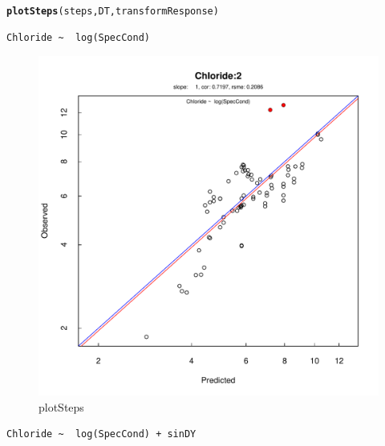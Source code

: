 \documentclass[a4paper,11pt]{article}\usepackage[]{graphicx}\usepackage[]{color}
\makeatletter
\def\maxwidth{ %
  \ifdim\Gin@nat@width>\linewidth
    \linewidth
  \else
    \Gin@nat@width
  \fi
}
\newcommand{\hlstd}[1]{\textcolor[rgb]{0.345,0.345,0.345}{#1}}%
\newcommand{\hlkwd}[1]{\textcolor[rgb]{0.737,0.353,0.396}{\textbf{#1}}}%
\newenvironment{kframe}{%
 \def\at@end@of@kframe{}%
 \ifinner\ifhmode%
  \def\at@end@of@kframe{\end{minipage}}%
  \begin{minipage}{\columnwidth}%
 \fi\fi%
 \def\FrameCommand##1{\hskip\@totalleftmargin \hskip-\fboxsep
 \colorbox{shadecolor}{##1}\hskip-\fboxsep
     \hskip-\linewidth \hskip-\@totalleftmargin \hskip\columnwidth}%
 \MakeFramed {\advance\hsize-\width
   \@totalleftmargin\z@ \linewidth\hsize
   \@setminipage}}%
 {\par\unskip\endMakeFramed%
 \at@end@of@kframe}
\newenvironment{knitrout}{}{} %
\makeatother
\begin{document}
\begin{knitrout}
\color{fgcolor}\begin{kframe}
\begin{alltt}
\hlkwd{plotSteps}\hlstd{(steps,DT,transformResponse)}
\end{alltt}
\begin{verbatim}
Chloride ~  log(SpecCond) 
\end{verbatim}
\end{kframe}\begin{figure}[]

\includegraphics[width=\maxwidth]{figure/plotSteps1} \caption[plotSteps]{plotSteps\label{fig:plotSteps1}}
\end{figure}

\begin{kframe}\begin{verbatim}
Chloride ~  log(SpecCond) + sinDY 
\end{verbatim}
\end{kframe}\begin{figure}[]


\end{figure}
\end{knitrout}
\end{document}
